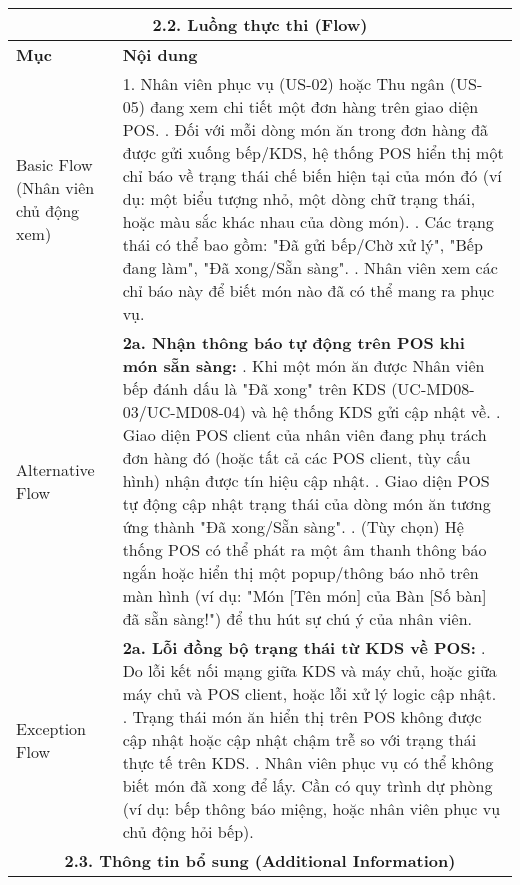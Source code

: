 \begin{longtable}{|m{4cm}|p{11cm}|}
\hline
\multicolumn{2}{|c|}{\textbf{2.2. Luồng thực thi (Flow)}} \\
\hline
\textbf{Mục} & \textbf{Nội dung} \\
\hline
Basic Flow (Nhân viên chủ động xem) & 1. Nhân viên phục vụ (US-02) hoặc Thu ngân (US-05) đang xem chi tiết một đơn hàng trên giao diện POS. \newline 2. Đối với mỗi dòng món ăn trong đơn hàng đã được gửi xuống bếp/KDS, hệ thống POS hiển thị một chỉ báo về trạng thái chế biến hiện tại của món đó (ví dụ: một biểu tượng nhỏ, một dòng chữ trạng thái, hoặc màu sắc khác nhau của dòng món). \newline 3. Các trạng thái có thể bao gồm: "Đã gửi bếp/Chờ xử lý", "Bếp đang làm", "Đã xong/Sẵn sàng". \newline 4. Nhân viên xem các chỉ báo này để biết món nào đã có thể mang ra phục vụ. \\
\hline
Alternative Flow & \textbf{2a. Nhận thông báo tự động trên POS khi món sẵn sàng:} \newline    1. Khi một món ăn được Nhân viên bếp đánh dấu là "Đã xong" trên KDS (UC-MD08-03/UC-MD08-04) và hệ thống KDS gửi cập nhật về. \newline    2. Giao diện POS client của nhân viên đang phụ trách đơn hàng đó (hoặc tất cả các POS client, tùy cấu hình) nhận được tín hiệu cập nhật. \newline    3. Giao diện POS tự động cập nhật trạng thái của dòng món ăn tương ứng thành "Đã xong/Sẵn sàng". \newline    4. (Tùy chọn) Hệ thống POS có thể phát ra một âm thanh thông báo ngắn hoặc hiển thị một popup/thông báo nhỏ trên màn hình (ví dụ: "Món [Tên món] của Bàn [Số bàn] đã sẵn sàng!") để thu hút sự chú ý của nhân viên. \\
\hline
Exception Flow & \textbf{2a. Lỗi đồng bộ trạng thái từ KDS về POS:} \newline    1. Do lỗi kết nối mạng giữa KDS và máy chủ, hoặc giữa máy chủ và POS client, hoặc lỗi xử lý logic cập nhật. \newline    2. Trạng thái món ăn hiển thị trên POS không được cập nhật hoặc cập nhật chậm trễ so với trạng thái thực tế trên KDS. \newline    3. Nhân viên phục vụ có thể không biết món đã xong để lấy. Cần có quy trình dự phòng (ví dụ: bếp thông báo miệng, hoặc nhân viên phục vụ chủ động hỏi bếp). \\
\hline
\multicolumn{2}{|c|}{\textbf{2.3. Thông tin bổ sung (Additional Information)}} \\

\end{longtable}
